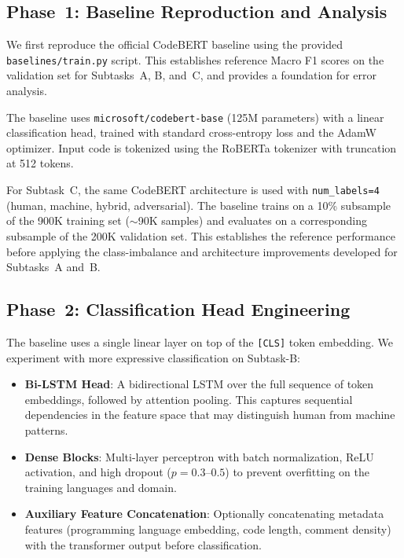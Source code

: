 \documentclass[11pt]{article}
\begin{document}

\subsection{Phase~1: Baseline Reproduction and Analysis}

We first reproduce the official CodeBERT baseline \cite{feng-etal-2020-codebert} using the provided \texttt{baselines/train.py} script. This establishes reference Macro F1 scores on the validation set for Subtasks~A, B, and~C, and provides a foundation for error analysis.

The baseline uses \texttt{microsoft/codebert-base} (125M parameters) with a linear classification head, trained with standard cross-entropy loss and the AdamW optimizer. Input code is tokenized using the RoBERTa tokenizer with truncation at 512 tokens.

For Subtask~C, the same CodeBERT architecture is used with \texttt{num\_labels=4} (human, machine, hybrid, adversarial). The baseline trains on a 10\% subsample of the 900K training set ($\sim$90K samples) and evaluates on a corresponding subsample of the 200K validation set. This establishes the reference performance before applying the class-imbalance and architecture improvements developed for Subtasks~A and~B.

\subsection{Phase~2: Classification Head Engineering}

The baseline uses a single linear layer on top of the \texttt{[CLS]} token embedding. We experiment with more expressive classification  on Subtask-B:

\begin{itemize}
    \item \textbf{Bi-LSTM Head}: A bidirectional LSTM over the full sequence of token embeddings, followed by attention pooling. This captures sequential dependencies in the feature space that may distinguish human from machine patterns.
    \item \textbf{Dense Blocks}: Multi-layer perceptron with batch normalization, ReLU activation, and high dropout ($p=0.3$--$0.5$) to prevent overfitting on the training languages and domain.
    \item \textbf{Auxiliary Feature Concatenation}: Optionally concatenating metadata features (programming language embedding, code length, comment density) with the transformer output before classification.
\end{itemize}
\end{document}

